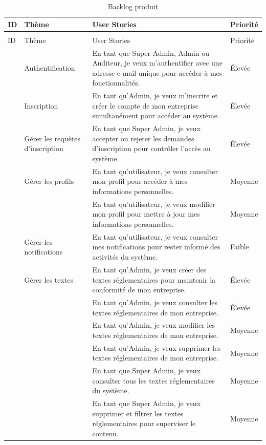 \begin{longtable}{|>{\raggedright\arraybackslash}p{0.5cm}|>{\raggedright\arraybackslash}p{3cm}|>{\raggedright\arraybackslash}p{8cm}|>{\raggedright\arraybackslash}p{2cm}|}
\caption{Backlog produit}\label{tab:user_stories}\\
\hline
ID & Thème & User Stories & Priorité \\
\hline
\endfirsthead
\multicolumn{4}{c}{\tablename\ \thetable\ -- suite} \\
\hline
ID & Thème & User Stories & Priorité \\
\hline
\endhead
1 & Authentification & En tant que Super Admin, Admin ou Auditeur, je veux m'authentifier avec une adresse e-mail unique pour accéder à mes fonctionnalités. & Élevée \\
\hline
2 & Inscription & En tant qu'Admin, je veux m'inscrire et créer le compte de mon entreprise simultanément pour accéder au système. & Élevée \\
\hline
3 & Gérer les requêtes d'inscription & En tant que Super Admin, je veux accepter ou rejeter les demandes d'inscription pour contrôler l'accès au système. & Élevée \\
\hline
4 & Gérer les profils & En tant qu'utilisateur, je veux consulter mon profil pour accéder à mes informations personnelles. & Moyenne \\
\cline{3-4}
& & En tant qu'utilisateur, je veux modifier mon profil pour mettre à jour mes informations personnelles. & Moyenne \\
\hline
5 & Gérer les notifications & En tant qu'utilisateur, je veux consulter mes notifications pour rester informé des activités du système. & Faible \\
\hline
6 & Gérer les textes & En tant qu'Admin, je veux créer des textes réglementaires pour maintenir la conformité de mon entreprise. & Élevée \\
\cline{3-4}
& & En tant qu'Admin, je veux consulter les textes réglementaires de mon entreprise. & Élevée \\
\cline{3-4}
& & En tant qu'Admin, je veux modifier les textes réglementaires de mon entreprise. & Moyenne \\
\cline{3-4}
& & En tant qu'Admin, je veux supprimer les textes réglementaires de mon entreprise. & Moyenne \\
\cline{3-4}
& & En tant que Super Admin, je veux consulter tous les textes réglementaires du système. & Moyenne \\
\cline{3-4}
& & En tant que Super Admin, je veux supprimer et filtrer les textes réglementaires pour superviser le contenu. & Moyenne \\

\end{longtable}
